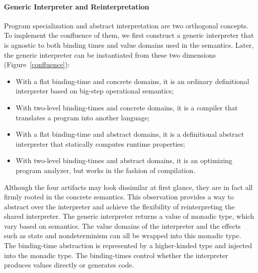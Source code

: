 \paragraph{Generic Interpreter and Reinterpretation}

Program specialization and abstract interpretation are two orthogonal
concepts.  To implement the confluence of them, we first construct a
generic interpreter that is agnostic to both binding times and value
domains used in the semantics.  Later, the generic interpreter can be
instantiated from these two dimensions (Figure~\ref{confluence}):
\begin{itemize}
\item With a flat binding-time and concrete domains, it is an ordinary
  definitional interpreter based on big-step operational semantics;
\item With two-level binding-times and concrete domains, it is a
  compiler that translates a program into another language;
\item With a flat binding-time and abstract domains, it is a
  definitional abstract interpreter \cite{DBLP:journals/pacmpl/DaraisLNH17}
  that statically computes runtime properties;
\item With two-level binding-times and abstract domains, it is an optimizing
  program analyzer, but works in the fashion of compilation.
\end{itemize}

Although the four artifacts may look dissimilar at first glance, they are in
fact all firmly rooted in the concrete semantics.  This observation provides a
way to abstract over the interpreter and achieve the flexibility of
reinterpreting the shared interpreter.  The generic interpreter returns a value
of monadic type, which vary based on semantics. The value domains
of the interpreter and the effects such as state and nondeterminism can all be
wrapped into this monadic type.  The binding-time abstraction is represented by
a higher-kinded type and injected into the monadic type.  The binding-times
control whether the interpreter produces values directly or generates code.


